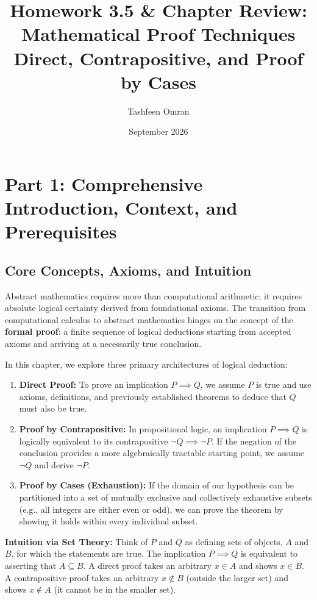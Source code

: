 \documentclass[11pt, letterpaper]{article}
\title{\textbf{Homework 3.5 \& Chapter Review: Mathematical Proof Techniques}\\ \Large Direct, Contrapositive, and Proof by Cases}
\author{Tashfeen Omran}
\date{September 2026}
\theoremstyle{definition}
\theoremstyle{remark}
\begin{document}
\maketitle
\tableofcontents
\newpage

\section{Part 1: Comprehensive Introduction, Context, and Prerequisites}

\subsection{Core Concepts, Axioms, and Intuition}
Abstract mathematics requires more than computational arithmetic; it requires absolute logical certainty derived from foundational axioms. The transition from computational calculus to abstract mathematics hinges on the concept of the \textbf{formal proof}: a finite sequence of logical deductions starting from accepted axioms and arriving at a necessarily true conclusion.

In this chapter, we explore three primary architectures of logical deduction:
\begin{enumerate}
    \item \textbf{Direct Proof:} To prove an implication $P \implies Q$, we assume $P$ is true and use axioms, definitions, and previously established theorems to deduce that $Q$ must also be true.
    \item \textbf{Proof by Contrapositive:} In propositional logic, an implication $P \implies Q$ is logically equivalent to its contrapositive $\neg Q \implies \neg P$. If the negation of the conclusion provides a more algebraically tractable starting point, we assume $\neg Q$ and derive $\neg P$.
    \item \textbf{Proof by Cases (Exhaustion):} If the domain of our hypothesis can be partitioned into a set of mutually exclusive and collectively exhaustive subsets (e.g., all integers are either even or odd), we can prove the theorem by showing it holds within every individual subset. 
\end{enumerate}

\textbf{Intuition via Set Theory:} Think of $P$ and $Q$ as defining sets of objects, $A$ and $B$, for which the statements are true. The implication $P \implies Q$ is equivalent to asserting that $A \subseteq B$. A direct proof takes an arbitrary $x \in A$ and shows $x \in B$. A contrapositive proof takes an arbitrary $x \notin B$ (outside the larger set) and shows $x \notin A$ (it cannot be in the smaller set). 
\end{document}
